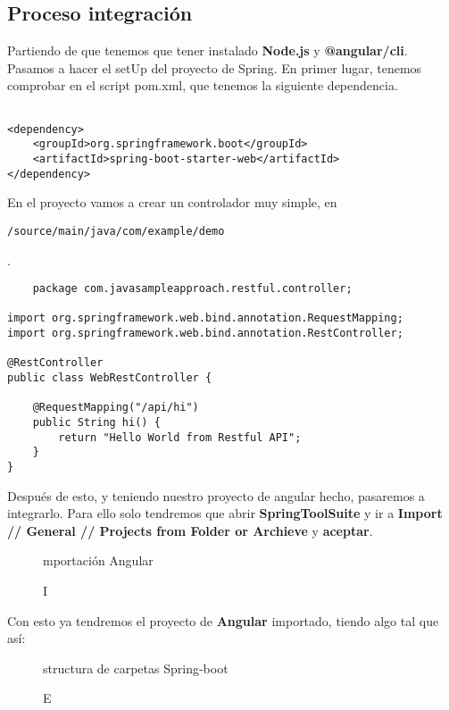 \documentclass[12pt,a4paper]{article}
\begin{document}
\subsection{Proceso integración} \label{pto82}

Partiendo de que tenemos que tener instalado \textbf{Node.js} y \textbf{@angular/cli}. Pasamos a hacer el setUp del proyecto de Spring. En primer lugar, tenemos comprobar en el script pom.xml, que tenemos la siguiente dependencia.

\begin{verbatim}

<dependency>
	<groupId>org.springframework.boot</groupId>
	<artifactId>spring-boot-starter-web</artifactId>
</dependency>

\end{verbatim}


En el proyecto vamos a crear un controlador muy simple, en \begin{verbatim}/source/main/java/com/example/demo\end{verbatim}.

\begin{verbatim}
    package com.javasampleapproach.restful.controller;
 
import org.springframework.web.bind.annotation.RequestMapping;
import org.springframework.web.bind.annotation.RestController;
 
@RestController
public class WebRestController {
 
	@RequestMapping("/api/hi")
	public String hi() {
		return "Hello World from Restful API";
	}
}
\end{verbatim}

Después de esto, y teniendo nuestro proyecto de angular hecho, pasaremos a integrarlo. Para ello solo tendremos que abrir \textbf{SpringToolSuite} y ir a \textbf{Import // General // Projects from Folder or Archieve} y \textbf{aceptar}.\\

\begin{figure}[!h]
\centering
{}
\caption Importación Angular
\label{itg1}
\end{figure}

\newpage

Con esto ya tendremos el proyecto de \textbf{Angular} importado, tiendo algo tal que así:

\begin{figure}[!h]
\centering
{}
\caption Estructura de carpetas Spring-boot
\label{itg2}
\end{figure}
\end{document}
